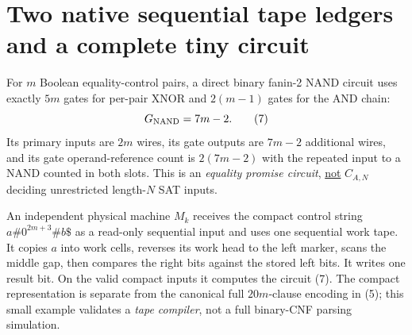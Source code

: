 \documentclass[11pt]{article}
\begin{document}
\section{Two native sequential tape ledgers and a complete tiny circuit}
For $m$ Boolean equality-control pairs, a direct binary fanin-2 NAND
circuit uses exactly $5m$ gates for per-pair XNOR and $2(m-1)$ gates
for the AND chain:
\[
                         G_{\rm NAND}=7m-2.                 \tag{7}
\]
Its primary inputs are $2m$ wires, its gate outputs are $7m-2$
additional wires, and its gate operand-reference count is
$2(7m-2)$ with the repeated input to a NAND counted in both slots.
This is an \emph{equality promise circuit}, \underline{not}
$C_{A,N}$ deciding unrestricted length-$N$ SAT inputs.

An independent physical machine $M_k$ receives the compact control
string $a\#0^{2m+3}\#b\$ $ as a read-only sequential input and uses one
sequential work tape. It copies $a$ into work cells, reverses its work
head to the left marker, scans the middle gap, then compares the right
bits against the stored left bits. It writes one result bit.
On the valid compact inputs it computes the circuit (7). The compact
representation is separate from the canonical full $20m$-clause
encoding in (5); this small example validates a \emph{tape compiler},
not a full binary-CNF parsing simulation.
\end{document}
